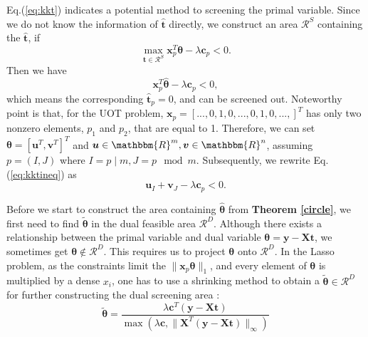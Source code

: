 \documentclass[twoside]{article}
\theoremstyle{plain}
\newcommand{\tranT}{T}
\newcommand{\R}{\mathbbm{R}}
\newcommand{\mat}[1]{\mathbf{#1}}
\renewcommand{\vec}[1]{\bm{#1}}
\newcommand{\changeHK}[1]{\textcolor{red}{#1}}
\begin{document}
Eq.(\ref{eq:kkt}) indicates a potential method to screening the primal variable. Since we do not know the information of $\hat{\vec{t}}$ directly, we construct an area $\mathcal{R}^{S}$ containing the $\hat{\vec{t}}$, if
\begin{equation}
\max_{\vec{t} \in \mathcal{R}^S} \vec{x}_p^{\tranT}\vec{\theta} -\lambda \vec{c}_p < 0.
\end{equation}
Then we have
 \begin{equation}
 \vec{x}_p^{\tranT}\hat{\vec{\theta}} -\lambda \vec{c}_p < 0,
 \label{eq:kktineq}
\end{equation}
which means the corresponding $\hat{\vec{t}}_p = 0$, and can be screened out. Noteworthy point is that, for the UOT problem, $\vec{x}_p = [...,0,1,0,...,0,1,0,...,]^{\tranT}$ has only two nonzero elements, $p_1$ and $p_2$, that are equal to 1. Therefore, we can set $\vec{\theta} = [\vec{u}^{\tranT},\vec{v}^{\tranT}]^{\tranT}$ and $\vec{u}\in\R^{m}, \vec{v}\in\R^{n}$, assuming $p=(I,J)$ where $I = p \mid m, J = p \mod m$. Subsequently, we rewrite Eq.(\ref{eq:kktineq}) as 
%
 \begin{equation}
\vec{u}_{I} + \vec{v}_{J}-\lambda \vec{c}_p < 0.
\end{equation}

Before we start to construct the area containing $\hat{\vec{\theta}}$ from {\bf Theorem \ref{circle}}, we first need to find $\tilde{\vec{\theta}}$ in the dual feasible area $\mathcal{R}^{D}$. Although there exists a relationship between the primal variable and dual variable $\vec{\theta} = \vec{y} - \mat{X}\vec{t}$, we sometimes get $\vec{\theta} \notin \mathcal{R}^{D}$. This requires us to project $\vec{\theta}$ onto $\mathcal{R}^{D}$. In the Lasso problem, as the constraints limit the $\|\vec{x}_p \vec{\theta}\|_1$, and every element of $\vec{\theta}$ is multiplied by a dense $x_i$, one has to use a shrinking method to obtain a $\tilde{\vec{\theta}} \in \mathcal{R}^{D}$ for further constructing the dual screening area \changeHK{\cite{xxxxx}}: 
\begin{equation*}
\tilde{\vec{\theta}} = \frac{\lambda \vec{c} ^{\tranT}(\vec{y} - \mat{X} \vec{t})}{\max(\lambda \vec{c}, \|\mat{X}^{\tranT}(\vec{y}-\mat{X}\vec{t})\|_{\infty})}
\end{equation*}
\end{document}
